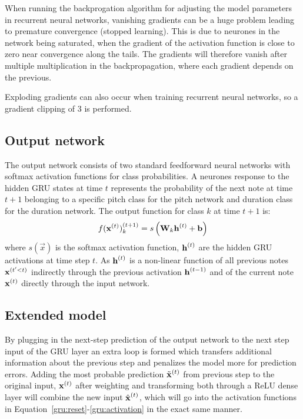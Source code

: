 	When running the backprogation algorithm for adjusting the model parameters in recurrent neural networks, vanishing gradients can be a huge problem leading to premature convergence (stopped learning). This is due to neurones in the network being saturated, when the gradient of the activation function is close to zero near convergence along the tails. The gradients will therefore vanish after multiple multiplication in the backpropagation, where each gradient depends on the previous. 

	Exploding gradients can also occur when training recurrent neural networks, so a gradient clipping of 3 is performed.  

\subsection{Output network} %
\label{sub:output_network}
	The output network consists of two standard feedforward neural networks with softmax activation functions for class probabilities. A neurones response to the hidden GRU states at time $t$ represents the probability of the next note at time $t+1$ belonging to a specific pitch class for the pitch network and duration class for the duration network.
	The output function for class $k$ at time $t+1$ is:
	\begin{equation}
		f(\vec{x}\order{t})\order{t+1}_k = s\left(\mat{W}_k \vec{h}\order{t} + \vec{b}\right)%
	\end{equation}
	where $s(\vec{x})$ is the softmax activation function, $\bm{\mathrm{h}}^{(t)}$ are the hidden GRU activations at time step $t$. As $\bm{\mathrm{h}}^{(t)}$ is a non-linear function of all previous notes $\bm{\mathrm{x}}^{(t'<t)}$ indirectly through the previous activation $\bm{\mathrm{h}}^{(t-1)}$ and of the current note $\bm{\mathrm{x}}^{(t)}$ directly through the input network.   
	
	\subsection{Extended model} %
	\label{sub:extended_model}
		By plugging in the next-step prediction of the output network to the next step input of the GRU layer an extra loop is formed which transfers additional information about the previous step and penalizes the model more for prediction errors.  
		Adding the most probable prediction $\tilde{\bm{\mathrm{x}}}^{(t)}$ from previous step to the original input, $\bm{\mathrm{x}}^{(t)}$ after weighting and transforming both through a ReLU dense layer will combine the new input $\hat{\vec{x}}\order{t}$, which will go into the activation functions in Equation~\eqref{gru:reset}-\eqref{gru:activation} in the exact same manner.

